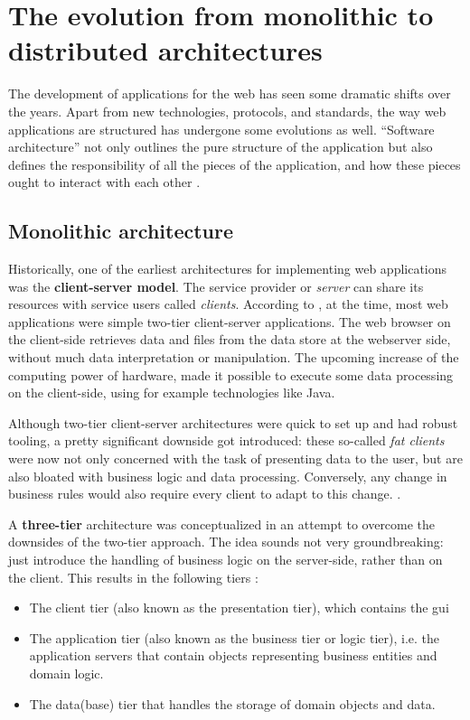 \section{The evolution from monolithic to distributed architectures}

The development of applications for the web has seen some dramatic shifts over
the years. Apart from new technologies, protocols, and standards, the way web
applications are structured has undergone some evolutions as well. ``Software
architecture'' not only outlines the pure structure of the application but also
defines the responsibility of all the pieces of the application, and how these
pieces ought to interact with each other \autocite{Fedorov_etal_1998}.


\subsection{Monolithic architecture}

Historically, one of the earliest architectures for implementing web
applications was the \textbf{client-server model}. The service provider or
\textit{server} can share its resources with service users called
\textit{clients}. According to \textcite{Reese_2000}, at the time, most web
applications were simple two-tier client-server applications. The web browser on
the client-side retrieves data and files from the data store at the webserver
side, without much data interpretation or manipulation. The upcoming increase of
the computing power of hardware, made it possible to execute some data
processing on the client-side, using for example technologies like Java. 

Although two-tier client-server architectures were quick to set up and had
robust tooling, a pretty significant downside got introduced: these so-called
\textit{fat clients} were now not only concerned with the task of presenting
data to the user, but are also bloated with business logic and data processing.
Conversely, any change in business rules would also require every client to adapt
to this change. \autocite{Gallaugher_Ramanathan_1996}.

A \textbf{three-tier} architecture was conceptualized in an attempt to overcome
the downsides of the two-tier approach. The idea sounds not very groundbreaking:
just introduce the handling of business logic on the server-side, rather than on
the client. This results in the following tiers \autocite{Aarsten_etal_1996}:

\begin{itemize}
    \item The client tier (also known as the presentation tier), which contains
    the \gls{gui}
    \item The application tier (also known as the business tier or logic tier),
    i.e. the application servers that contain objects representing business
    entities and domain logic.
    \item The data(base) tier that handles the storage of domain objects and data.
\end{itemize}


